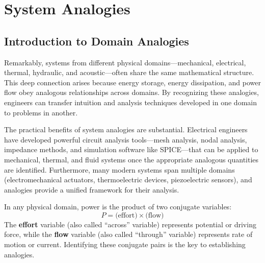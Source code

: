 
\chapter{System Analogies}
\label{ch:analogies}

\section{Introduction to Domain Analogies}
\label{sec:analogy_intro}

Remarkably, systems from different physical domains---mechanical, electrical, thermal, hydraulic, and acoustic---often share the same mathematical structure. This deep connection arises because energy storage, energy dissipation, and power flow obey analogous relationships across domains. By recognizing these analogies, engineers can transfer intuition and analysis techniques developed in one domain to problems in another.

The practical benefits of system analogies are substantial. Electrical engineers have developed powerful circuit analysis tools---mesh analysis, nodal analysis, impedance methods, and simulation software like SPICE---that can be applied to mechanical, thermal, and fluid systems once the appropriate analogous quantities are identified. Furthermore, many modern systems span multiple domains (electromechanical actuators, thermoelectric devices, piezoelectric sensors), and analogies provide a unified framework for their analysis.

\begin{keyconceptbox}[title=Power-Conjugate Variables]
In any physical domain, power is the product of two conjugate variables:
\begin{equation}
P = \text{(effort)} \times \text{(flow)}
\end{equation}
The \textbf{effort} variable (also called ``across'' variable) represents potential or driving force, while the \textbf{flow} variable (also called ``through'' variable) represents rate of motion or current. Identifying these conjugate pairs is the key to establishing analogies.
\end{keyconceptbox}

